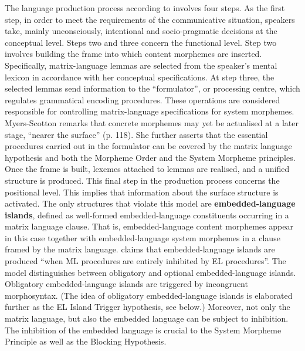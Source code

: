 The language production process according to \citet[116--119]{myers-scotton-duelling-1993} involves four steps. As the first step, in order to meet the requirements of the communicative situation, speakers take, mainly unconsciously, intentional and socio-pragmatic decisions at the conceptual level. Steps two and three concern the functional level. Step two involves building the frame into which content morphemes are inserted. Specifically, matrix-language lemmas are selected from the speaker's mental lexicon in accordance with her conceptual specifications. At step three, the selected lemmas send information to the ``formulator'', or processing centre, which regulates grammatical encoding procedures. These operations are considered responsible for controlling matrix-language specifications for system morphemes. Myers-Scotton remarks that concrete morphemes may yet be actualised at a later stage, ``nearer the surface'' (p. 118). She further asserts that the essential procedures carried out in the formulator can be covered by the matrix language hypothesis and both the Morpheme Order and the System Morpheme principles. Once the frame is built, lexemes attached to lemmas are realised, and a unified structure is produced. This final step in the production process concerns the positional level. This implies that information about the surface structure is activated. The only structures that violate this model are \textbf{embedded-language islands}, defined as well-formed embedded-language constituents occurring in a matrix language clause. That is, embedded-language content morphemes appear in this case together with embedded-language system morphemes in a clause framed by the matrix language. \citet[119]{myers-scotton-duelling-1993} claims that embedded-language islands are produced ``when ML procedures are entirely inhibited by EL procedures''. The model  distinguishes between obligatory and optional embedded-language islands. Obligatory embedded-language islands are triggered by incongruent morphosyntax. (The idea of obligatory embedded-language islands is elaborated further as the EL Island Trigger hypothesis, see below.) Moreover, not only the matrix language, but also the embedded language can be subject to inhibition. The inhibition of the embedded language is crucial to the System Morpheme Principle as well as the Blocking Hypothesis.

